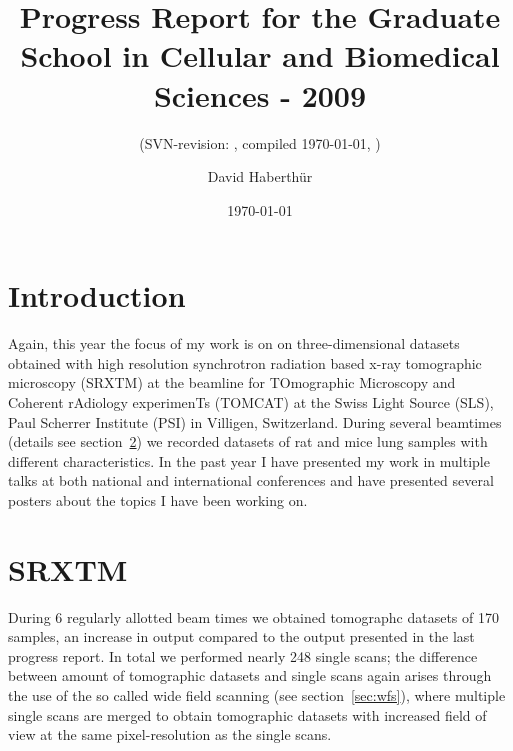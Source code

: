 \documentclass[a4paper,twoside,english,DIV=calc]{scrartcl}
\title{Progress Report for the Graduate School in Cellular and Biomedical Sciences - 2009}
\subtitle{(SVN-revision: \svnkw{LastChangedRevision}, compiled \today, \thistime)}
\author{David Haberthür}
\date{\today}
\begin{document}
\maketitle

\section{Introduction}
Again, this year the focus of my work is on on three-dimensional datasets obtained with high resolution synchrotron radiation based x-ray tomographic microscopy (SRXTM) at the beamline for TOmographic Microscopy and Coherent rAdiology experimenTs (TOMCAT) at the Swiss Light Source (SLS), Paul Scherrer Institute (PSI) in Villigen, Switzerland. During several beamtimes (details see section~\ref{sec:srxtm}) we recorded datasets of rat and mice lung samples with different characteristics. In the past year I have presented my work in multiple talks at both national and international conferences and have presented several posters about the topics I have been working on.

\section{SRXTM}\label{sec:srxtm}
During 6 regularly allotted beam times we obtained tomographc datasets of 170 samples, an increase in output compared to the output presented in the last progress report. In total we performed nearly 248 single scans; the difference between amount of tomographic datasets and single scans again arises through the use of the so called wide field scanning (see section~\ref{sec:wfs}), where multiple single scans are merged to obtain tomographic datasets with increased field of view at the same pixel-resolution as the single scans.
\end{document}
